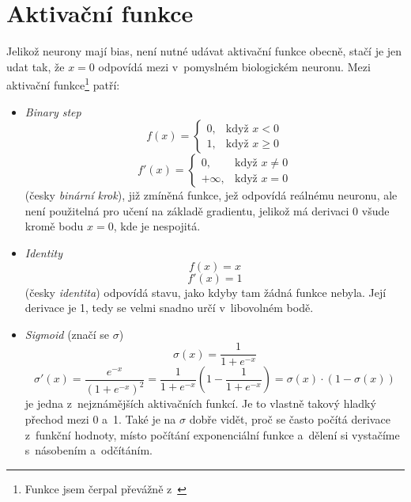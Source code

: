 \documentclass[12pt]{report}			%
\begin{document}
				\section{Aktivační funkce} \label{s:af}
				Jelikož neurony mají bias, není nutné udávat aktivační funkce obecně, stačí je jen udat tak, že $x=0$ odpovídá mezi v~pomyslném biologickém neuronu. Mezi aktivační funkce\footnote{Funkce jsem čerpal převážně z~\autocite{wiki:ActivationFunctions}} patří:
				\begin{itemize}
					\item \emph{Binary step}
						\begin{equation}f(x) = \begin{cases}0, & \text{když } x < 0\\1, & \text{když } x \geq 0 \end{cases}\end{equation}
						\begin{equation}f'(x) = \begin{cases}0, & \text{když } x \neq 0\\\mathrm{+\infty}, & \text{když } x = 0 \end{cases}\end{equation}
						(česky \emph{binární krok}), již zmíněná funkce, jež odpovídá reálnému neuronu, ale není použitelná pro učení na základě gradientu, jelikož má derivaci 0 všude kromě bodu $x = 0$, kde je nespojitá.
					\item \emph{Identity}
						\begin{equation}f(x) = x\end{equation}
						\begin{equation}f'(x) = 1 \end{equation}
						(česky \emph{identita}) odpovídá stavu, jako kdyby tam žádná funkce nebyla. Její derivace je 1, tedy se velmi snadno určí v~libovolném bodě.
					\item \emph{Sigmoid} (značí se $\sigma$)
						\begin{equation}\sigma(x) = \frac{1}{1+e^{-x}}\end{equation}										
						\begin{equation}\sigma'(x) = \frac{e^{-x}}{\left(1+e^{-x}\right)^2} = \frac{1}{1+e^{-x}}\left(1-\frac{1}{1+e^{-x}}\right) = \sigma(x)\cdot\left(1-\sigma(x)\right)\end{equation}										
						je jedna z~nejznámějších aktivačních funkcí. Je to vlastně takový hladký přechod mezi 0 a~1. Také je na $\sigma$ dobře vidět, proč se často počítá derivace z~funkční hodnoty, místo počítání exponenciální funkce a~dělení si vystačíme s~násobením a~odčítáním.
						

\end{itemize}
\end{document}

